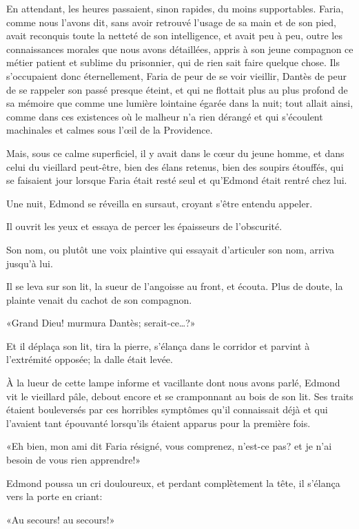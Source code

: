 En attendant, les heures passaient, sinon rapides, du moins supportables. Faria, comme nous l'avons dit, sans avoir retrouvé l'usage de sa main et de son pied, avait reconquis toute la netteté de son intelligence, et avait peu à peu, outre les connaissances morales que nous avons détaillées, appris à son jeune compagnon ce métier patient et sublime du prisonnier, qui de rien sait faire quelque chose. Ils s'occupaient donc éternellement, Faria de peur de se voir vieillir, Dantès de peur de se rappeler son passé presque éteint, et qui ne flottait plus au plus profond de sa mémoire que comme une lumière lointaine égarée dans la nuit; tout allait ainsi, comme dans ces existences où le malheur n'a rien dérangé et qui s'écoulent machinales et calmes sous l'œil de la Providence.

Mais, sous ce calme superficiel, il y avait dans le cœur du jeune homme, et dans celui du vieillard peut-être, bien des élans retenus, bien des soupirs étouffés, qui se faisaient jour lorsque Faria était resté seul et qu'Edmond était rentré chez lui.

Une nuit, Edmond se réveilla en sursaut, croyant s'être entendu appeler.

Il ouvrit les yeux et essaya de percer les épaisseurs de l'obscurité.

Son nom, ou plutôt une voix plaintive qui essayait d'articuler son nom, arriva jusqu'à lui.

Il se leva sur son lit, la sueur de l'angoisse au front, et écouta. Plus de doute, la plainte venait du cachot de son compagnon.

«Grand Dieu! murmura Dantès; serait-ce\dots?»

Et il déplaça son lit, tira la pierre, s'élança dans le corridor et parvint à l'extrémité opposée; la dalle était levée.

À la lueur de cette lampe informe et vacillante dont nous avons parlé, Edmond vit le vieillard pâle, debout encore et se cramponnant au bois de son lit. Ses traits étaient bouleversés par ces horribles symptômes qu'il connaissait déjà et qui l'avaient tant épouvanté lorsqu'ils étaient apparus pour la première fois.

«Eh bien, mon ami dit Faria résigné, vous comprenez, n'est-ce pas? et je n'ai besoin de vous rien apprendre!»

Edmond poussa un cri douloureux, et perdant complètement la tête, il s'élança vers la porte en criant:

«Au secours! au secours!»

